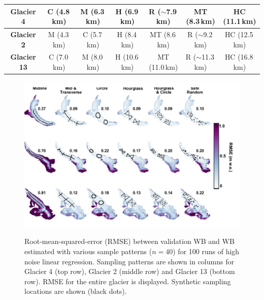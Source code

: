 \documentclass[twocolumn,letterpaper]{igs}
\begin{document}
\begin{table}[]
\begin{tabular}{ccccccc}
\textbf{Glacier 4} & \textcolor{C}{C} (4.8\,km) & \textcolor{M}{M} (6.3\,km) & \textcolor{H}{H} (6.9\,km) & \textcolor{R}{R} ($\sim$7.9\,km) & \textcolor{MT}{MT} (8.3\,km) & \textcolor{HC}{HC} (11.1\,km) \\ \midrule
\textbf{Glacier 2} & \textcolor{M}{M} (4.3\,km) & \textcolor{C}{C} (5.7\,km) & \textcolor{H}{H} (8.4\,km) & \textcolor{MT}{MT} (8.6\,km) & \textcolor{R}{R} ($\sim$9.2\,km) & \textcolor{HC}{HC} (12.5\,km) \\ \midrule
\textbf{Glacier 13} & \textcolor{C}{C} (7.0\,km) & \textcolor{M}{M} (8.0\,km) & \textcolor{H}{H} (10.6\,km) & \textcolor{MT}{MT} (11.0\,km) & \textcolor{R}{R} ($\sim$11.3\,km) & \textcolor{HC}{HC} (16.8\,km)
\end{tabular}
\end{table}

\begin{figure}
	\centering
	\includegraphics[width =\textwidth]{SynObsRMSEmap.pdf}\\
	\caption{Root-mean-squared-error (RMSE) between validation WB and WB estimated with various sample patterns ($n=40$) for 100 runs of high noise linear regression. Sampling patterns are shown in columns for Glacier 4 (top row), Glacier 2 (middle row) and Glacier 13 (bottom row). RMSE for the entire glacier is displayed. Synthetic sampling locations are shown (black dots).}
	\label{fig:SynObsRMSEmap}
\end{figure}
\end{document}

